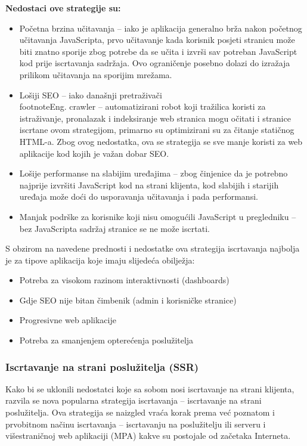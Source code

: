 \bigskip

\textbf{Nedostaci ove strategije su:}

\begin{itemize}
    \item Početna brzina učitavanja – iako je aplikacija generalno brža nakon početnog učitavanja JavaScripta, prvo učitavanje kada korisnik posjeti stranicu može biti znatno sporije zbog potrebe da se učita i izvrši sav potreban JavaScript kod prije iscrtavanja sadržaja. Ovo ograničenje posebno dolazi do izražaja prilikom učitavanja na sporijim mrežama.
    \item Lošiji SEO – iako današnji pretraživači\\footnote{Eng. crawler – automatizirani robot koji tražilica koristi za istraživanje, pronalazak i indeksiranje web stranica \cite{googlesearch}} mogu očitati i stranice iscrtane ovom strategijom, primarno su optimizirani su za čitanje statičnog HTML-a. Zbog ovog nedostatka, ova se strategija se sve manje koristi za web aplikacije kod kojih je važan dobar SEO.
    \item Lošije performanse na slabijim uređajima – zbog činjenice da je potrebno najprije izvršiti JavaScript kod na strani klijenta, kod slabijih i starijih uređaja može doći do usporavanja učitavanja i pada performansi.
    \item Manjak podrške za korisnike koji nisu omogućili JavaScript u pregledniku – bez JavaScripta sadržaj stranice se ne može iscrtati.
\end{itemize}

S obzirom na navedene prednosti i nedostatke ova strategija iscrtavanja najbolja je za tipove aplikacija koje imaju slijedeća obilježja:
\begin{itemize}
    \item Potreba za visokom razinom interaktivnosti (dashboards)
    \item Gdje SEO nije bitan čimbenik (admin i korisničke stranice)
    \item Progresivne web aplikacije
    \item Potreba za smanjenjem opterećenja poslužitelja
\end{itemize}
\vfill

\subsubsection{Iscrtavanje na strani poslužitelja (SSR)}

Kako bi se uklonili nedostatci koje sa sobom nosi iscrtavanje na strani klijenta, razvila se nova popularna strategija iscrtavanja – iscrtavanje na strani poslužitelja. Ova strategija se naizgled vraća korak prema već poznatom i prvobitnom načinu iscrtavanja – iscrtavanju na poslužitelju ili serveru i višestraničnoj web aplikaciji (MPA) kakve su postojale od začetaka Interneta.

